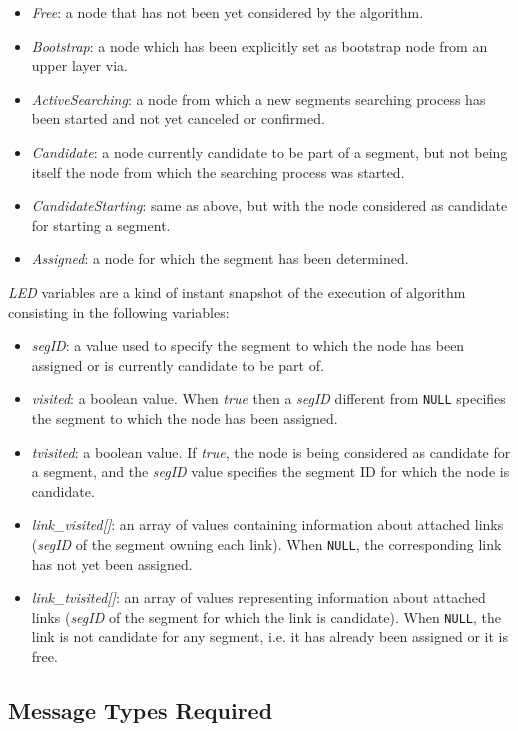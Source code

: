 \begin{itemize}
\item{\emph{Free}}: a node that has not been yet considered by the \disr{} algorithm.
\item{\emph{Bootstrap}}: a node which has been explicitly set as bootstrap node from
an upper layer via. 
\item{\emph{ActiveSearching}}: a node from which a new segments searching process has
been started and not yet canceled or confirmed. 
\item{\emph{Candidate}}: a node currently candidate to be part of a segment, but not 
being itself the node from which the searching process was started. 
\item{\emph{CandidateStarting}}: same as above, but with the node considered as candidate
for starting a segment. 
\item{\emph{Assigned}}: a node for which the segment has been determined.
\end{itemize}

\emph{LED} variables are a kind of instant snapshot of the execution of \disr{} algorithm
consisting in the following variables:

\begin{itemize}
\item{\emph{segID}}: a value used to specify the segment to which the
node has been assigned or is currently candidate to be part of.
\item{\emph{visited}}: a boolean value. When \emph{true}
then a \emph{segID} different from \texttt{NULL} specifies the segment 
to which the node has been assigned. 
\item{\emph{tvisited}}: a boolean value. If \emph{true}, the node is
being considered as candidate for a segment, and the \emph{segID} value
specifies the segment ID for which the node is candidate. 
\item{\emph{link\_visited[]}}: an array
of values containing information about attached links (\emph{segID} of the segment 
owning each link). When \texttt{NULL}, the corresponding link has not yet been
assigned.
\item{\emph{link\_tvisited[]}}: an array of
values representing information about attached links (\emph{segID} of
the segment for which the link is candidate). When \texttt{NULL}, the link is
not candidate for any segment, i.e. it has already been assigned or it is free.
\end{itemize}

\subsection{Message Types Required}

